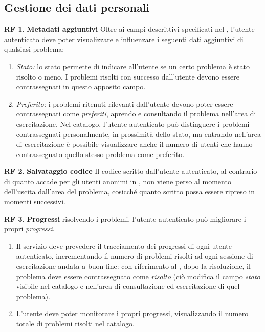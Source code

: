 \documentclass[11pt, a4paper]{article}
\theoremstyle{definition}
\newtheorem{funcreq}{RF} %
\begin{document}
\subsection{Gestione dei dati personali}\label{gestprofilo}

\begin{funcreq}
\label{metadata}
    \textbf{Metadati aggiuntivi }
    Oltre ai campi descrittivi specificati nel \textcolor{blue}{},
    l'utente autenticato deve poter visualizzare e influenzare i seguenti dati aggiuntivi di
    qualsiasi problema:
    \begin{enumerate}
        \item \textit{Stato:} lo stato permette di indicare all'utente se un certo problema
        è stato risolto o meno. I problemi risolti con successo dall'utente devono essere
        contrassegnati in questo apposito campo.

        \item \textit{Preferito:} i problemi ritenuti rilevanti dall'utente devono poter
        essere contrassegnati come \textit{preferiti}, aprendo e consultando il problema
        nell'area di esercitazione.
        Nel catalogo, l'utente autenticato può distinguere i problemi contrassegnati
        personalmente, in prossimità dello stato, ma entrando nell'area di esercitazione
        è possibile visualizzare anche il numero di utenti che hanno contrassegnato
        quello stesso problema come preferito.
    \end{enumerate}
\end{funcreq}

\begin{funcreq}
\label{code}
\textbf{Salvataggio codice } Il codice scritto dall'utente autenticato, al contrario di
quanto accade per gli utenti anonimi in
\textcolor{blue}{},
non viene perso al momento dell'uscita dall'area del problema, cosicché
quanto scritto possa essere ripreso in momenti successivi.
\end{funcreq}

\begin{funcreq}
\label{stats}
\textbf{Progressi } risolvendo i problemi, l'utente autenticato può migliorare
i propri \textit{progressi}.
\begin{enumerate}
    \item Il servizio deve prevedere il tracciamento dei progressi di ogni
    utente autenticato, incrementando il numero di problemi risolti ad ogni
    sessione di esercitazione andata a buon fine: con riferimento al
    \textcolor{blue}{},
    dopo la risoluzione, il problema deve essere contrassegnato come
    \textit{risolto} (ciò modifica il campo \textit{stato} visibile nel catalogo
    e nell'area di consultazione ed esercitazione di quel problema).

    \item L'utente deve poter monitorare i propri progressi, visualizzando il
    numero totale di problemi risolti nel catalogo.
\end{enumerate}
\end{funcreq}
\end{document}
